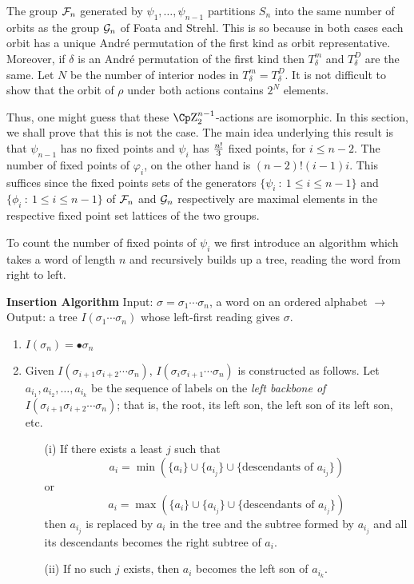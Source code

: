 The group ${\cal F}_n$ generated by $\psi_1,\ldots, \psi_{n-1}$ partitions $S_n$ into 
the same number of orbits as the group ${\cal G}_n$ of
Foata and Strehl.  This is so because in both cases each orbit has a
unique Andr\'e permutation of the first kind as orbit representative. 
Moreover, if $\delta$ is an Andr\'e permutation of the first kind then
$T_\delta^m$ and  
$T_\delta^D$ are the same.  Let $N$ be the number of interior nodes
in $T_\delta^m=T_\delta^D$. It is not difficult to show that  the orbit
of $\rho$ under both actions contains $2^N$ elements.
  
Thus, one might guess that these  $\Zzz _2^{n-1}$-actions are
isomorphic. In this section, we 
shall prove that this is not the case. The main idea
underlying this result is that $\psi_{n-1}$ has no fixed
points and $\psi_i$ has ${n!} \over{3}$ 
fixed points, for $i \le n-2$. The number of fixed points of $\varphi_i$,
on the other hand is $(n-2)!(i-1)i$.  This suffices 
 since the fixed points  sets
of the generators $\{ \psi_ i\::\: 1\leq i\leq n-1\}$ and $\{ \phi_
i\::\: 1\leq i\leq n-1\}$ of ${\cal F}_n$ and ${\cal G}_n$
respectively are maximal elements in the respective fixed point set
lattices of the two groups. 

To count the number of fixed points of $\psi_i$ we first
introduce an algorithm which takes a word of length
$n$ and recursively builds up a tree, reading the word from
right to left.

{\noindent}{\bf Insertion Algorithm} Input: $\sigma = \sigma_1\cdots \sigma_n$,
a word on an ordered alphabet 
$\longrightarrow$ Output: a tree $I(\sigma_1\cdots \sigma_n)$ whose
left-first reading gives $\sigma$. 

\begin{enumerate}
\item $I(\sigma_n) = \bullet \sigma_n$
\item Given $I(\sigma_{i+1}\sigma_{i+2}\cdots \sigma_{n})$,
$I(\sigma_{i}\sigma_{i+1}\cdots \sigma_{n})$ is constructed as follows.
Let $a_{i_1},a_{i_2},\ldots,a_{i_k}$ be the sequence of labels
on the {\em left backbone of  $I(\sigma_{i+1}\sigma_{i+2}\cdots \sigma_{n})$};
that is, the root, its left son, the left son of its left son, etc.
\begin{enumerate}
\item[(i)]
If there exists a least $j$ such that 
$$
a_i = \min \left(\{a_i\} \cup \{a_{i_j}\} \cup \{\mbox {descendants of } a_{i_j}\}\right)
$$
or
$$
a_i = \max \left(\{a_i\} \cup \{a_{i_j}\} \cup \{\mbox {descendants of } a_{i_j}\}\right)
$$
then $a_{i_j}$ is replaced by $a_i$ in the tree and the subtree formed by 
$a_{i_j}$ and all its descendants becomes the right subtree of
$a_i$.
\item[(ii)]
If no such $j$ exists, then $a_i$ becomes the left son of $a_{i_k}$.
\end{enumerate}
\end{enumerate}

